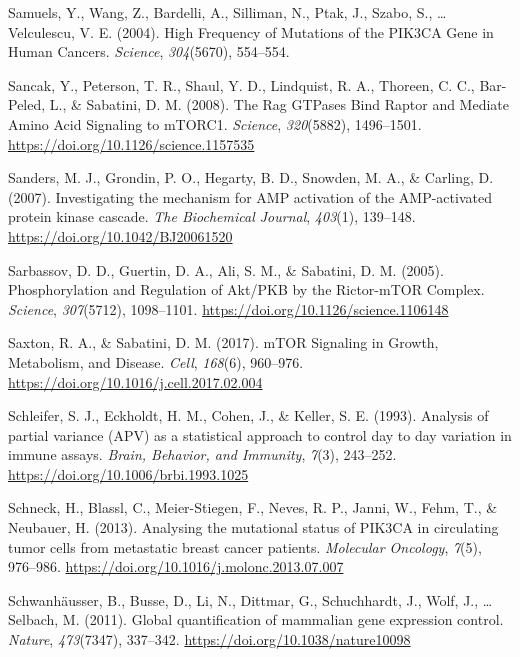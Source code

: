 \documentclass[12pt,openany]{book}
\begin{document}
\hypertarget{ref-Samuels2004}{}
Samuels, Y., Wang, Z., Bardelli, A., Silliman, N., Ptak, J., Szabo, S.,
\ldots{} Velculescu, V. E. (2004). High Frequency of Mutations of the
PIK3CA Gene in Human Cancers. \emph{Science}, \emph{304}(5670),
554--554.

\hypertarget{ref-Sancak2008}{}
Sancak, Y., Peterson, T. R., Shaul, Y. D., Lindquist, R. A., Thoreen, C.
C., Bar-Peled, L., \& Sabatini, D. M. (2008). The Rag GTPases Bind
Raptor and Mediate Amino Acid Signaling to mTORC1. \emph{Science},
\emph{320}(5882), 1496--1501.
\url{https://doi.org/10.1126/science.1157535}

\hypertarget{ref-Sanders2007}{}
Sanders, M. J., Grondin, P. O., Hegarty, B. D., Snowden, M. A., \&
Carling, D. (2007). Investigating the mechanism for AMP activation of
the AMP-activated protein kinase cascade. \emph{The Biochemical
Journal}, \emph{403}(1), 139--148.
\url{https://doi.org/10.1042/BJ20061520}

\hypertarget{ref-Sarbassov2005}{}
Sarbassov, D. D., Guertin, D. A., Ali, S. M., \& Sabatini, D. M. (2005).
Phosphorylation and Regulation of Akt/PKB by the Rictor-mTOR Complex.
\emph{Science}, \emph{307}(5712), 1098--1101.
\url{https://doi.org/10.1126/science.1106148}

\hypertarget{ref-Saxton2017}{}
Saxton, R. A., \& Sabatini, D. M. (2017). mTOR Signaling in Growth,
Metabolism, and Disease. \emph{Cell}, \emph{168}(6), 960--976.
\url{https://doi.org/10.1016/j.cell.2017.02.004}

\hypertarget{ref-Schleifer1993}{}
Schleifer, S. J., Eckholdt, H. M., Cohen, J., \& Keller, S. E. (1993).
Analysis of partial variance (APV) as a statistical approach to control
day to day variation in immune assays. \emph{Brain, Behavior, and
Immunity}, \emph{7}(3), 243--252.
\url{https://doi.org/10.1006/brbi.1993.1025}

\hypertarget{ref-Schneck2013}{}
Schneck, H., Blassl, C., Meier-Stiegen, F., Neves, R. P., Janni, W.,
Fehm, T., \& Neubauer, H. (2013). Analysing the mutational status of
PIK3CA in circulating tumor cells from metastatic breast cancer
patients. \emph{Molecular Oncology}, \emph{7}(5), 976--986.
\url{https://doi.org/10.1016/j.molonc.2013.07.007}

\hypertarget{ref-Schwanhausser2011}{}
Schwanhäusser, B., Busse, D., Li, N., Dittmar, G., Schuchhardt, J.,
Wolf, J., \ldots{} Selbach, M. (2011). Global quantification of
mammalian gene expression control. \emph{Nature}, \emph{473}(7347),
337--342. \url{https://doi.org/10.1038/nature10098}
\end{document}
